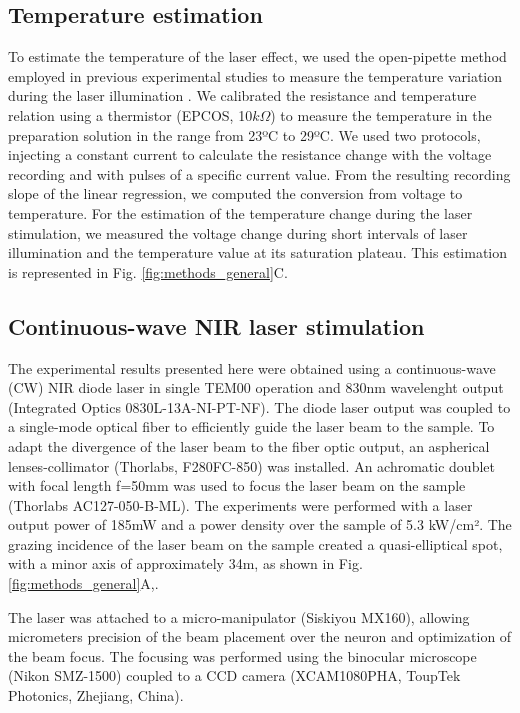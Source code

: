 \subsection{Temperature estimation}
\label{sec:temperature-estimation}
To estimate the temperature of the laser effect, we used the open-pipette method employed in previous experimental studies to measure the temperature variation during the laser illumination \cite{Li2013, Rabbitt2016,Brown2020, Brown2021}. We calibrated the resistance and temperature relation using a thermistor (EPCOS, 10$k\Omega$) to measure the temperature in the preparation solution in the range from 23ºC to 29ºC. We used two protocols, injecting a constant current to calculate the resistance change with the voltage recording and with pulses of a specific current value. From the resulting recording slope of the linear regression, we computed the conversion from voltage to temperature. For the estimation of the temperature change during the laser stimulation, we measured the voltage change during short intervals of laser illumination and the temperature value at its saturation plateau. This estimation is represented in Fig. \ref{fig:methods_general}C.

\subsection{Continuous-wave NIR laser stimulation}
The experimental results presented here were obtained using a continuous-wave (CW) NIR diode laser in single TEM00 operation and 830nm wavelenght output (Integrated Optics 0830L-13A-NI-PT-NF). 
The diode laser output was coupled to a single-mode optical fiber to efficiently guide the laser beam to the sample. To adapt the divergence of the laser beam to the fiber optic output, an aspherical lenses-collimator (Thorlabs, F280FC-850) was installed. An achromatic doublet with focal length f=50mm was used to focus the laser beam on the sample (Thorlabs AC127-050-B-ML). The experiments were performed with a laser output power of 185mW and a power density over the sample of 5.3 kW/cm². The grazing incidence of the laser beam on the sample created a quasi-elliptical spot, with a minor axis of approximately 34{\textmu}m, as shown in Fig. \ref{fig:methods_general}A,.

The laser was attached to a micro-manipulator (Siskiyou MX160), allowing micrometers precision of the beam placement over the neuron and optimization of the beam focus. The focusing was performed using the binocular microscope (Nikon SMZ-1500) coupled to a CCD camera (XCAM1080PHA, ToupTek Photonics, Zhejiang, China).

